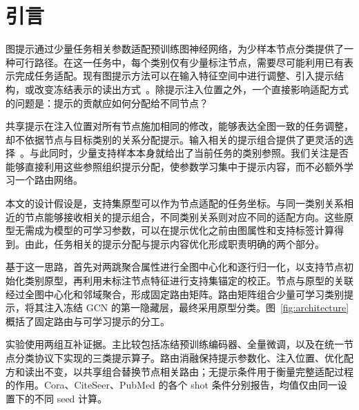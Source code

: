 \begin{abstract}
本文提出原型路由图提示方法 \method，利用支持集原型将可学习提示分配给不同节点。在每类仅有少量标注的条件下，任务适配不仅需要学习提示内容，还需要确定提示应当作用于哪些节点。\method 从聚合节点属性构造类别参照，在保留支持集锚点的同时利用未标注图特征进行校正，并将节点与原型的关联转换为固定路由矩阵。该矩阵组合可学习类别提示，将其注入冻结图卷积编码器，最终采用原型分类。我们在 Cora、CiteSeer、PubMed 上分别评估 1、3、5-shot 设置，对各条件使用配对的支持抽样与训练种子。5-shot 下，三个数据集的 Accuracy 分别为 73.02\%、66.17\%、70.98\%；相对同配方共享提示，原型路由在对应条件下分别带来 36.94、40.45、3.02 个百分点的提升。这些逐条件配对结果支持原型关系对提示分配的组织价值，结论限于所评估的传导式节点分类设置。
\end{abstract}

\section{引言}
图提示通过少量任务相关参数适配预训练图神经网络，为少样本节点分类提供了一种可行路径。在这一任务中，每个类别仅有少量标注节点，需要尽可能利用已有表示完成任务适配。现有图提示方法可以在输入特征空间中进行调整、引入提示结构，或改变冻结表示的读出方式~\citep{gpf2023,allinone2023,graphprompt2023}。除提示注入位置之外，一个直接影响适配方式的问题是：提示的贡献应如何分配给不同节点？

共享提示在注入位置对所有节点施加相同的修改，能够表达全图一致的任务调整，却不依据节点与目标类别的关系分配提示。输入相关的提示组合提供了更灵活的选择~\citep{gpf2023}。与此同时，少量支持样本本身就给出了当前任务的类别参照。我们关注是否能够直接利用这些参照组织提示分配，使参数学习集中于提示内容，而不必额外学习一个路由网络。

本文的设计假设是，支持集原型可以作为节点适配的任务坐标。与同一类别关系相近的节点能够接收相关的提示组合，不同类别关系则对应不同的适配方向。这些原型无需成为模型的可学习参数，可以在提示优化之前由图属性和支持标签计算得到。由此，任务相关的提示分配与提示内容优化形成职责明确的两个部分。

基于这一思路，\method 首先对两跳聚合属性进行全图中心化和逐行归一化，以支持节点初始化类别原型，再利用未标注节点特征进行支持集锚定的校正。节点与原型的关联经过全图中心化和邻域聚合，形成固定路由矩阵。路由矩阵组合少量可学习类别提示，将其注入冻结 GCN 的第一隐藏层，最终采用原型分类。图~\ref{fig:architecture} 概括了固定路由与可学习提示的分工。

实验使用两组互补证据。主比较包括冻结预训练编码器、全量微调，以及在统一节点分类协议下实现的三类提示算子。路由消融保持提示参数化、注入位置、优化配方和读出不变，以共享组合替换节点相关路由；无提示条件用于衡量完整适配过程的作用。Cora、CiteSeer、PubMed 的各个 shot 条件分别报告，均值仅由同一设置下的不同 seed 计算。

